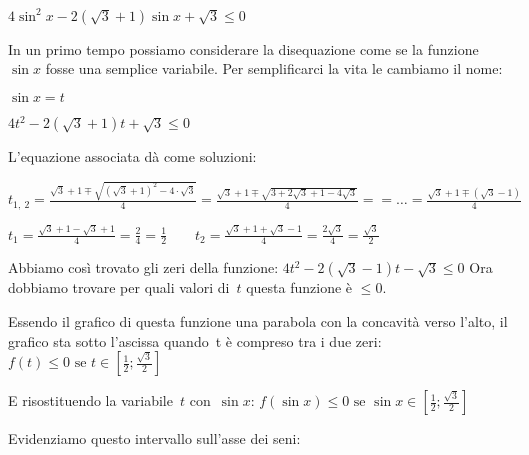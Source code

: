  \begin{esempio}
  $4 \sin^2 x - 2 (\sqrt{3} + 1) \sin x + \sqrt{3} \le 0$
  
  In un primo tempo possiamo considerare la disequazione come se la funzione 
  $\sin x$ fosse una semplice variabile.
  Per semplificarci la vita le cambiamo il nome:
  
  $\sin x = t$
  
  $4 t^2 - 2 (\sqrt{3} + 1) t + \sqrt{3} \le 0$
  
  L'equazione associata dà come soluzioni:
  
  $t_{1,~2} = 
   \frac{\sqrt{3} + 1 \mp \sqrt{(\sqrt{3} + 1)^2 - 4 \cdot \sqrt{3}}}{4} =  
   \frac{\sqrt{3} + 1 \mp \sqrt{3 + 2 \sqrt{3} +1 -  4 \sqrt{3}}}{4} = 
   = \dots = \frac{\sqrt{3} + 1 \mp (\sqrt{3} -1)}{4}$

  $t_{1} = \frac{\sqrt{3} + 1 - \sqrt{3} +1}{4} = 
           \frac{2}{4} = \frac{1}{2} \qquad
   t_{2} = \frac{\sqrt{3} + 1 + \sqrt{3} -1}{4} = 
           \frac{2 \sqrt{3}}{4} = \frac{\sqrt{3}}{2} $
  
  Abbiamo così trovato gli zeri della funzione: 
  $4 t^2 - 2 (\sqrt{3} - 1) t - \sqrt{3} \le 0$
  Ora dobbiamo trovare per quali valori di~$t$ questa funzione è $\le 0$.
  
  Essendo il grafico di questa funzione una parabola con la concavità verso 
  l'alto, il grafico sta sotto l'ascissa quando~t è compreso tra i due zeri:
  $f(t) \le 0 \text{ se } 
        t \in \left[\frac{1}{2}; \frac{\sqrt{3}}{2} \right]$ 
  
  E risostituendo la variabile~$t$ con~$\sin x$:
  $f(\sin x) \le 0 \text{ se } 
        \sin x \in \left[\frac{1}{2}; \frac{\sqrt{3}}{2} \right]$ 
        
  Evidenziamo questo intervallo sull'asse dei seni:
  
 \vspace{-6pt}
  \begin{center}
\begin{inaccessibleblock}
    
\end{inaccessibleblock}
  \end{center}


\end{esempio}
